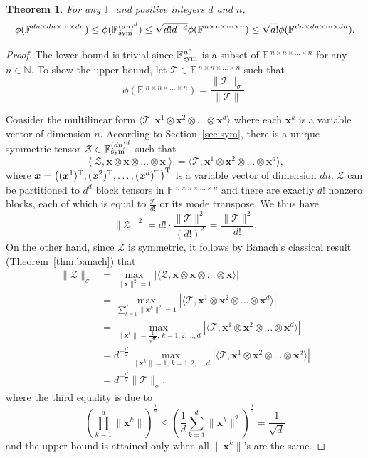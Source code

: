 \documentclass[11pt]{article}
\newtheorem{theorem}{Theorem}[section]
\newcommand{\N}{\mathbb{N}}
\newcommand{\BF}{\mathbb{F}\:\!}
\newcommand{\Z}{\mathcal{Z}}
\newcommand{\TT}{\mathcal{T}}
\newcommand{\bx}{\boldsymbol{x}}
\newcommand{\T}{\textnormal{T}}
\newcommand{\sym}{\textnormal{sym}}
\begin{document}
\begin{theorem} \label{thm:sym}
  For any $\BF$ and positive integers $d$ and $n$,
  $$
  \phi(\BF^{dn\times dn\times \dots \times dn}) \le \phi(\BF^{(dn)^d}_\sym) \le  \sqrt{d!d^{-d}}\phi(\BF^{n\times n\times \dots \times n}) \le \sqrt{d!}\phi(\BF^{dn\times dn\times \dots \times dn}).
  $$
\end{theorem}
\begin{proof}
  The lower bound is trivial since $\BF^{n^d}_\sym$ is a subset of $\BF^{n\times n\times \dots \times n}$ for any $n\in\N$. To show the upper bound, let $\TT\in \BF^{n\times n\times \dots \times n}$ such that $$
  \phi(\BF^{n\times n\times \dots \times n}) = \frac{\|\TT\|_\sigma}{\|\TT\|}.$$

  Consider the multilinear form $\langle\TT, \bx^1\otimes \bx^2 \otimes \dots \otimes \bx^d\rangle$ where each $\bx^k$ is a variable vector of dimension $n$. According to Section~\ref{sec:sym}, there is a unique symmetric tensor $\Z\in\BF^{(dn)^d}_\sym$ such that
  $$
  \left\langle\Z, \bx\otimes \bx \otimes \dots \otimes \bx\right\rangle = \langle\TT, \bx^1\otimes \bx^2 \otimes \dots \otimes \bx^d\rangle,
  $$
  where $\bx=\left((\bx^1)^{\T},(\bx^2)^{\T},\dots,(\bx^d)^{\T}\right)^{\T}$ is a variable vector of dimension $dn$. $\Z$ can be partitioned to $d^d$ block tensors in $\BF^{n\times n\times \dots \times n}$ and there are exactly $d!$ nonzero blocks, each of which is equal to $\frac{\TT}{d!}$ or its mode transpose. We thus have
  $$
  \|\Z\|^2 = d!\cdot \frac{\|\TT\|^2}{(d!)^2} = \frac{\|\TT\|^2}{d!}.
  $$
  On the other hand, since $\Z$ is symmetric, it follows by Banach's classical result (Theorem~\ref{thm:banach}) that
  \begin{align*}
  \|\Z\|_\sigma &=\max_{\|\bx\|^2=1} |\langle\Z, \bx\otimes \bx \otimes \dots \otimes \bx\rangle| \\
  & =\max_{\sum_{k=1}^d\|\bx^k\|^2=1} |\langle\TT, \bx^1\otimes \bx^2 \otimes \dots \otimes \bx^d\rangle| \\
  & =\max_{\|\bx^k\|=\frac{1}{\sqrt{d}},\,k=1,2,\dots,d} |\langle\TT, \bx^1\otimes \bx^2 \otimes \dots \otimes \bx^d\rangle| \\
  & =d^{-\frac{d}{2}}\max_{\|\bx^k\|=1,\,k=1,2,\dots,d} |\langle\TT, \bx^1\otimes \bx^2 \otimes \dots \otimes \bx^d\rangle| \\
  & = d^{-\frac{d}{2}}\|\TT\|_\sigma,
\end{align*}
where the third equality is due to $$\left(\prod_{k=1}^d\|\bx^k\|\right)^{\frac{1}{d}}\le\left(\frac{1}{d}\sum_{k=1}^d\|\bx^k\|^2\right)^{\frac{1}{2}}=\frac{1}{\sqrt{d}}$$
and the upper bound is attained only when all $\|\bx^k\|$'s are the same.


\end{proof}
\end{document}
